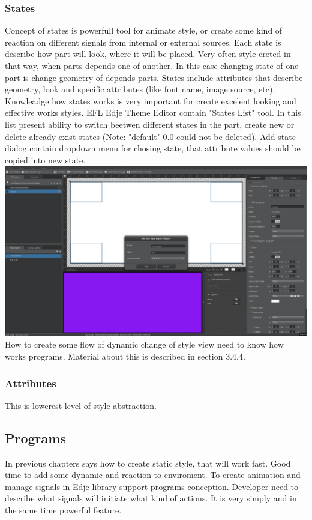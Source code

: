 \documentclass[titlepage,oneside,11pt]{book}
\begin{document}
\subsubsection{States}
Concept of states is powerfull tool for animate style, or create some kind of reaction on different signals from internal or external sources. Each state is describe how part will look, where it will be placed. Very often style creted in that way, when parts depends one of another. In this case changing state of one part is change geometry of depends parts.\newline
States include attributes that describe geometry, look and specific attributes (like font name, image source, etc). Knowleadge how states works is very important for create excelent looking and effective works styles.\newline
EFL Edje Theme Editor contain "{}States List"{} tool. In this list present ability to switch beetwen different states in the part, create new or delete already exist states (Note: "default" 0.0 could not be deleted). Add state dialog contain dropdown menu for chosing state, that attribute values should be copied into new state.\newline
\includegraphics[scale=0.2]{images/state_add_dialog.jpg}\newline
How to create some flow of dynamic change of style view need to know how works programs. Material about this is described in section 3.4.4.
\subsubsection{Attributes}
This is lowerest level of style abstraction. %
\subsection{Programs}
In previous chapters says how to create static style, that will work fast. Good time to add some dynamic and reaction to enviroment. To create animation and manage signals in Edje library support programs conception. Developer need to describe what signals will initiate what kind of actions. It is very simply and in the same time powerful feature.\newline
\end{document}
